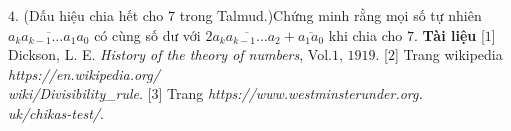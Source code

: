 \begin{multicols}{2}
	\vskip 0.1cm	
	$4.$ (Dấu hiệu chia hết cho $7$ trong Talmud.)\linebreak Chứng minh rằng mọi số tự nhiên $\overline{a_k a_{k-1}\ldots a_1a_0}$ có cùng số dư với $2\overline{a_k a_{k-1}\ldots a_2} + \overline{a_1a_0}$ khi chia cho $7$. 
	\vskip 0.1cm
	\textbf{\color{quantoan}Tài liệu}
	\vskip 0.1cm	
	[$1$] Dickson, L. E. \textit{History of the theory of numbers}, Vol.$1$, $1919$.
	\vskip 0.1cm 
	[$2$] Trang wikipedia \textit{https://en.wikipedia.org/\\wiki/Divisibility\_rule}.
	\vskip 0.1cm
	[$3$] Trang \textit{https://www.westminsterunder.org.\\uk/chikas-test/}.
\end{multicols}

